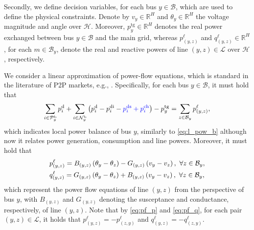 \documentclass{IEEEtran}  %
\newcommand{\mc}{\mathcal}
\newcommand{\bb}{\mathbb}
\newcommand{\0}{\mathbf{0}}
\newcommand{\1}{\mathbf{1}}
\newcommand{\edit}[1]{\color{blue}{#1}\color{black}}
\begin{document}
Secondly, we define decision variables, for each bus $y \in \mc B$, which are used to define the physical constraints. Denote by $v_y \in \bb R^H$ and $\theta_y \in \bb R^H$ the voltage magnitude and angle over $\mc H$.  Moreover, $p^{\mathrm{tg}}_y \in \mathbb{R}^H$ denotes the real power exchanged between bus $y \in \mc B$ and the main grid, whereas $p_{(y,z)}^{\ell}$ and $q_{(y,z)}^{\ell} \in \bb R^H$, for each $m \in \mc B_y$, denote the real and reactive powers of line $(y,z) \in \mc L$ over $\mc H$, respectively. 

\smallskip
We consider a linear approximation of power-flow equations, which is standard in the literature of P2P markets, e.g., \cite{yang2019,moret2020}. Specifically, for each bus $y \in \mc B$, it must hold that
\begin{equation}
\sum_{i \in \mc P_y^\mathrm{b}}p_i^{\mathrm{d}}+ \sum_{i\in \mc N_y^{\mathrm b}} \left(p_i^{\mathrm d}-p_{i}^{\mathrm{di}}-\edit{p_{i}^{\mathrm{ds}}+p_{i}^{\mathrm{ch}}}\right)-p_{y}^{\mathrm{tg}}=\sum_{z\in \mc B_y}p_{(y,z)}^{\ell}, \label{eq:p_bal_p}
\end{equation}
which indicates local power balance of bus $y$, similarly to \eqref{eq:l_pow_b} although now it relates power generation, consumption and line powers. Moreover, it must hold that
\begin{subequations}
\small
\label{eq:pf_pq}
\begin{align}
&p_{(y,z)}^{\ell} = B_{(y,z)}\left({\theta_y - \theta_z} \right) - G_{(y,z)}\left(v_y - v_z \right), \, \, \forall z \in \mc B_y, \label{eq:pf_p}\\
&q_{(y,z)}^{\ell} = G_{(y,z)}\left({\theta_y - \theta_z} \right) + B_{(y,z)}\left(v_y - v_z \right), \, \,  \forall z \in \mc B_y, \label{eq:pf_q}
\end{align}
\label{eq:pf_all}
\end{subequations}
which represent the power flow equations of line $(y,z)$ from the perspective of bus $y$, with $B_{(y,z)}$ and  $G_{(y,z)}$ denoting the susceptance and conductance, respectively, of line $(y,z)$. Note that by \eqref{eq:pf_p} and \eqref{eq:pf_q}, for each pair $(y,z) \in \mc L$, it holds that $p_{(y,z)}^{\ell} = {-p}_{(z,y)}^{\ell}$ and $q_{(y,z)}^{\ell} = {-q}_{(z,y)}^{\ell}$. 
\end{document}
